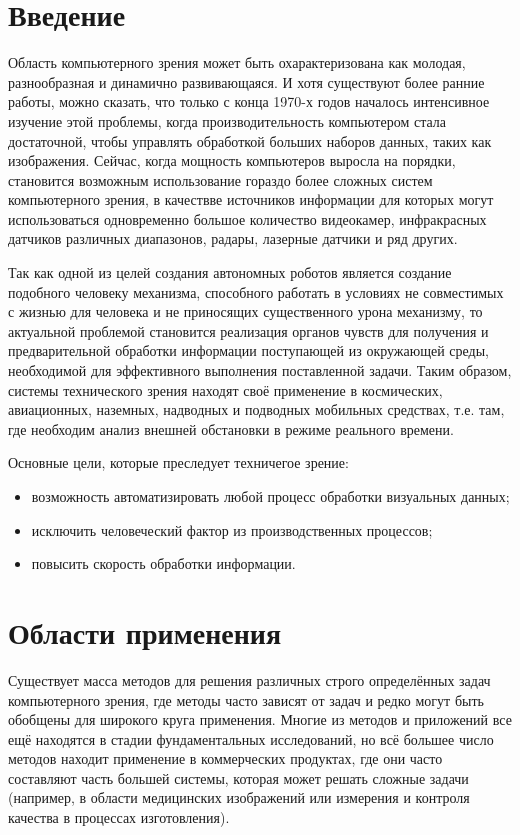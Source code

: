 \documentclass[a4paper,14pt]{extreport}
\begin{document}
	
\section*{Введение}

Область компьютерного зрения может быть охарактеризована как молодая, разнообразная и динамично развивающаяся. И хотя существуют более ранние работы, можно сказать, что только с конца 1970-х годов началось интенсивное изучение этой проблемы, когда производительность компьютером стала достаточной, чтобы управлять обработкой больших наборов данных, таких как изображения. Сейчас, когда мощность компьютеров выросла на порядки, становится возможным использование гораздо более сложных систем компьютерного зрения, в качествве источников информации для  которых могут использоваться одновременно большое количество видеокамер, инфракрасных датчиков различных диапазонов, радары, лазерные датчики и ряд других. 

Так как одной из целей создания автономных роботов является создание подобного человеку механизма, способного работать в условиях не совместимых с жизнью для человека и не приносящих существенного урона механизму, то актуальной проблемой становится реализация органов чувств для получения и предварительной обработки информации поступающей из окружающей среды, необходимой для эффективного выполнения поставленной задачи. Таким образом, системы технического зрения  находят своё применение в космических, авиационных, наземных, надводных и подводных мобильных средствах, т.е. там, где необходим анализ внешней обстановки в режиме реального времени.

Основные цели, которые преследует техничегое зрение:
\begin{itemize}
	\item возможность автоматизировать любой процесс обработки визуальных данных;
	\item исключить человеческий фактор из производственных процессов;
	\item повысить скорость обработки информации.
\end{itemize} 

	
\section{Области применения}
Существует масса методов для решения различных строго определённых задач компьютерного зрения, где методы часто зависят от задач и редко могут быть обобщены для широкого круга применения. Многие из методов и приложений все ещё находятся в стадии фундаментальных исследований, но всё большее число методов находит применение в коммерческих продуктах, где они часто составляют часть большей системы, которая может решать сложные задачи (например, в области медицинских изображений или измерения и контроля качества в процессах изготовления). 
\end{document}
